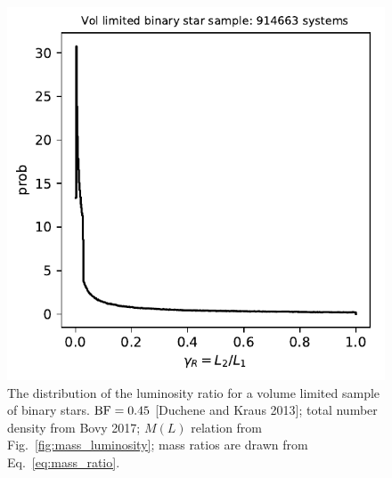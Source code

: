 \documentclass{emulateapj}
\begin{document}
\begin{figure}[!t]
	\begin{center}
		\includegraphics[scale=.8]{figures/gammaR_distribn_vol_limited.pdf}
	\end{center}
	\caption{The distribution of the luminosity ratio for a volume limited 
		sample of binary stars. ${\rm BF} = 0.45$ [Duchene and Kraus 2013]; 
		total 
		number density from Bovy 2017; $M(L)$ relation from 
		Fig.~\ref{fig:mass_luminosity}; mass ratios are drawn from 
		Eq.~\ref{eq:mass_ratio}.}
	\label{fig:gammaR_distribn_vol_limited}
\end{figure}
\end{document}
